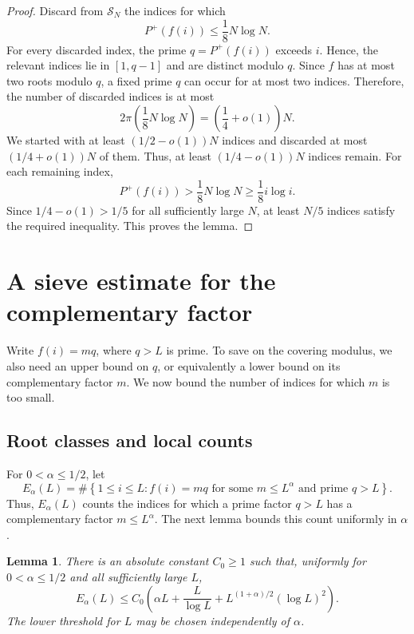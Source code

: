 \documentclass[11pt]{amsart}
\newtheorem{lemma}[theorem]{Lemma}
\theoremstyle{definition}
\theoremstyle{remark}
\begin{document}
\begin{proof}
Discard from $\mathcal S_N$ the indices for which
\[
P^+(f(i))\leq\frac18N\log N.
\]
For every discarded index, the prime $q=P^+(f(i))$ exceeds $i$.  Hence, the
relevant indices lie in $[1,q-1]$ and are distinct modulo $q$.  Since $f$
has at most two roots modulo $q$, a fixed prime $q$ can occur for at most two
indices.  Therefore,
the number of discarded indices is at most
\[
2\pi\left(\frac18N\log N\right)
=\left(\frac14+o(1)\right)N.
\]
We started with at least $(1/2-o(1))N$ indices and discarded at most
$(1/4+o(1))N$ of them.  Thus, at least $(1/4-o(1))N$ indices remain.  For
each remaining index,
\[
P^+(f(i))>\frac18N\log N\geq\frac18i\log i.
\]
Since $1/4-o(1)>1/5$ for all sufficiently large $N$, at least $N/5$ indices
satisfy the required inequality.  This proves the lemma.
\end{proof}

\section{A sieve estimate for the complementary factor}

Write $f(i)=mq$, where $q>L$ is prime.  To save on the covering modulus, we
also need an upper bound on $q$, or equivalently a lower bound on its
complementary factor $m$.  We now bound the number of indices for which $m$
is too small.

\subsection{Root classes and local counts}

For $0<\alpha\leq1/2$, let
\[
E_\alpha(L)
=
\#\left\{1\leq i\leq L:
 f(i)=mq\text{ for some }m\leq L^\alpha
 \text{ and prime }q>L
\right\}.
\]
Thus, $E_\alpha(L)$ counts the indices for which a prime factor $q>L$ has a
complementary factor $m\leq L^\alpha$.  The next lemma bounds this count
uniformly in $\alpha$.

\begin{lemma}\label{lem:smallcofactor}
There is an absolute constant $C_0\geq1$ such that, uniformly for $0<\alpha\leq1/2$ and all sufficiently large $L$,
\[
E_\alpha(L)
\leq
C_0\left(
\alpha L+\frac{L}{\log L}
+L^{(1+\alpha)/2}(\log L)^2
\right).
\]
The lower threshold for $L$ may be chosen independently of $\alpha$.
\end{lemma}
\end{document}
